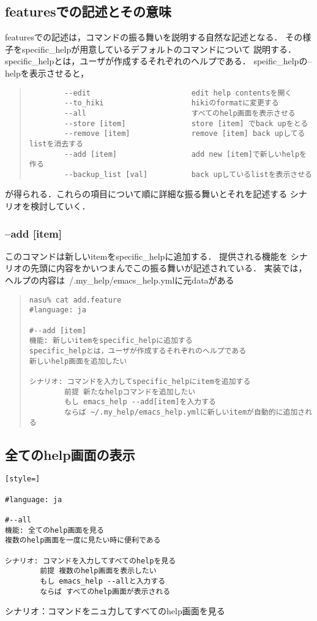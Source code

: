 
\subsection{featuresでの記述とその意味}
featuresでの記述は，コマンドの振る舞いを説明する自然な記述となる．
その様子をspecific\_helpが用意しているデフォルトのコマンドについて
説明する．specific\_helpとは，ユーザが作成するそれぞれのヘルプである．
speific\_helpの--helpを表示させると，
\begin{quote}\begin{verbatim}
        --edit                       edit help contentsを開く
        --to_hiki                    hikiのformatに変更する
        --all                        すべてのhelp画面を表示させる
        --store [item]               store [item] でback upをとる
        --remove [item]              remove [item] back upしてるlistを消去する
        --add [item]                 add new [item]で新しいhelpを作る
        --backup_list [val]          back upしているlistを表示させる
\end{verbatim}\end{quote}
が得られる．これらの項目について順に詳細な振る舞いとそれを記述する
シナリオを検討していく．

\subsubsection{--add [item]}
このコマンドは新しいitemをspecific\_helpに追加する．
提供される機能を
シナリオの先頭に内容をかいつまんでこの振る舞いが記述されている．
実装では，ヘルプの内容は~/.my\_help/emacs\_help.ymlに元dataがある
\begin{quote}\begin{verbatim}
nasu% cat add.feature
#language: ja

#--add [item]
機能: 新しいitemをspecific_helpに追加する
specific_helpとは，ユーザが作成するそれぞれのヘルプである
新しいhelp画面を追加したい

シナリオ: コマンドを入力してspecific_helpにitemを追加する
        前提 新たなhelpコマンドを追加したい
        もし emacs_help --add[item]を入力する
        ならば ~/.my_help/emacs_help.ymlに新しいitemが自動的に追加される

\end{verbatim}\end{quote}
\subsection{全てのhelp画面の表示}\begin{lstlisting}[style=]

#language: ja

#--all
機能: 全てのhelp画面を見る
複数のhelp画面を一度に見たい時に便利である

シナリオ: コマンドを入力してすべてのhelpを見る
        前提 複数のhelp画面を表示したい
        もし emacs_help --allと入力する
        ならば すべてのhelp画面が表示される
\end{lstlisting}
シナリオ：コマンドをニュ力してすべてのhelp画面を見る

